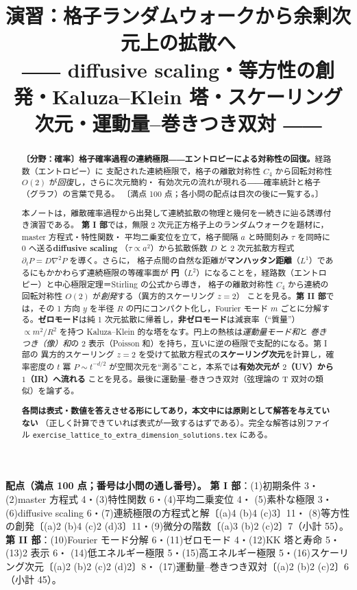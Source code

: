 \documentclass[dvipdfmx, uplatex]{jsarticle}
\title{演習：格子ランダムウォークから余剰次元上の拡散へ\\
\large ―― diffusive scaling・等方性の創発・Kaluza--Klein 塔・スケーリング次元・運動量--巻きつき双対 ――}
\author{}
\date{}
\theoremstyle{definition}
\begin{document}
\maketitle
\vspace{-6zh}

\begin{abstract}
\sloppy
\textbf{〔分野：確率〕格子確率過程の連続極限――エントロピーによる対称性の回復。}経路数（エントロピー）に
支配された連続極限で，格子の離散対称性 $C_4$ から回転対称性 $O(2)$ が\emph{回復}し，さらに次元簡約・
有効次元の流れが現れる――確率統計と格子（グラフ）の言葉で見る。
〔満点 100 点；各小問の配点は目次の後に一覧する。〕
\par\smallskip
本ノートは，離散確率過程から出発して連続拡散の物理と幾何を一続きに辿る誘導付き演習である。
\textbf{第 I 部}では，無限 2 次元正方格子上のランダムウォークを題材に，master 方程式・特性関数・
平均二乗変位を立て，格子間隔 $a$ と時間刻み $\tau$ を同時に $0$ へ送る\textbf{diffusive scaling}
（$\tau\propto a^2$）から拡散係数 $D$ と 2 次元拡散方程式 $\partial_tP=D\nabla^2P$ を導く。さらに，
格子点間の自然な距離が\textbf{マンハッタン距離}（$L^1$）であるにもかかわらず連続極限の等確率面が
\textbf{円}（$L^2$）になることを，経路数（エントロピー）と中心極限定理＝Stirling の公式から導き，
格子の離散対称性 $C_4$ から連続の回転対称性 $O(2)$ が\emph{創発}する（異方的スケーリング $z=2$）
ことを見る。\textbf{第 II 部}では，その 1 方向 $y$ を半径 $R$ の円にコンパクト化し，Fourier モード $m$
ごとに分解する。\textbf{ゼロモード}は純 1 次元拡散に帰着し，\textbf{非ゼロモード}は減衰率（``質量''）
$\propto m^2/R^2$ を持つ Kaluza--Klein 的な塔をなす。円上の熱核は\emph{運動量モード和}と
\emph{巻きつき（像）和}の 2 表示（Poisson 和）を持ち，互いに逆の極限で支配的になる。第 I 部の
異方的スケーリング $z=2$ を受けて拡散方程式の\textbf{スケーリング次元}を計算し，確率密度の $t$ 冪
$P\sim t^{-d/2}$ が空間次元を``測る''こと，本系では\textbf{有効次元が $2$（UV）から $1$（IR）へ流れる}
ことを見る。最後に運動量--巻きつき双対（弦理論の T 双対の類似）を論ずる。

\textbf{各問は表式・数値を答えさせる形にしてあり，本文中には原則として解答を与えていない}
（正しく計算できていれば表式が一致するはずである）。完全な解答は別ファイル
\texttt{exercise\_lattice\_to\_extra\_dimension\_solutions.tex} にある。
\end{abstract}

\tableofcontents

\medskip
{\small\sloppy
\noindent\textbf{配点（満点 100 点；番号は小問の通し番号）。}
\textbf{第 I 部}：(1)初期条件 3・(2)master 方程式 4・(3)特性関数 6・(4)平均二乗変位 4・
(5)素朴な極限 3・(6)diffusive scaling 6・(7)連続極限の方程式と解〔(a)4 (b)4 (c)3〕11・
(8)等方性の創発〔(a)2 (b)4 (c)2 (d)3〕11・(9)微分の階数〔(a)3 (b)2 (c)2〕7（小計 55）。\quad
\textbf{第 II 部}：(10)Fourier モード分解 6・(11)ゼロモード 4・(12)KK 塔と寿命 5・(13)2 表示 6・
(14)低エネルギー極限 5・(15)高エネルギー極限 5・(16)スケーリング次元〔(a)2 (b)2 (c)2 (d)2〕8・
(17)運動量--巻きつき双対〔(a)2 (b)2 (c)2〕6（小計 45）。
\par}
\end{document}
